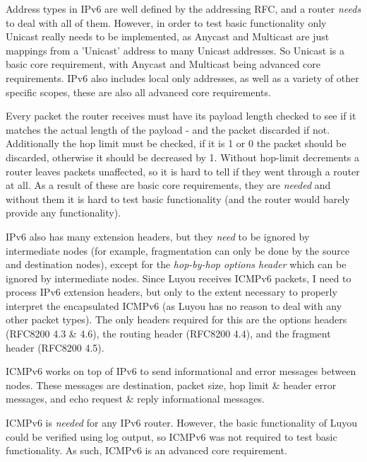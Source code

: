 \documentclass[12pt,a4paper,twoside,openany]{report}
\begin{document}
Address types in IPv6 are well defined by the addressing RFC\cite{ipv6_rfc_adr}, and a router \textit{needs} to deal with all of them.  However, in order to test basic functionality only Unicast really needs to be implemented, as Anycast and Multicast are just mappings from a 'Unicast' address to many Unicast addresses. So Unicast is a basic core requirement, with Anycast and Multicast being advanced core requirements. IPv6 also includes local only addresses, as well as a variety of other specific scopes, these are also all advanced core requirements.

\bigskip

Every packet the router receives must have its payload length checked to see if it matches the actual length of the payload - and the packet discarded if not.  Additionally the hop limit must be checked, if it is 1 or 0 the packet should be discarded, otherwise it should be decreased by 1.  Without hop-limit decrements a router leaves packets unaffected, so it is hard to tell if they went through a router at all. As a result of these are basic core requirements, they are \textit{needed} and without them it is hard to test basic functionality (and the router would barely provide any functionality). 

IPv6 also has many extension headers, but they \textit{need} to be ignored by intermediate nodes (for example, fragmentation can only be done by the source and destination nodes), except for the \textit{hop-by-hop options header} which can be ignored by intermediate nodes. Since Luyou receives ICMPv6 packets, I need to process IPv6 extension headers, but only to the extent necessary to properly interpret the encapsulated ICMPv6 (as Luyou has no reason to deal with any other packet types).  The only headers required for this are the options headers (RFC8200 4.3 \& 4.6\cite{ipv6_rfc}), the routing header (RFC8200 4.4\cite{ipv6_rfc}), and the fragment header (RFC8200 4.5\cite{ipv6_rfc}).

\bigskip

ICMPv6 works on top of IPv6 to send informational and error messages between nodes.  These messages are destination, packet size, hop limit \& header error messages, and echo request \& reply informational messages. 

ICMPv6 is \textit{needed} for any IPv6 router.  However, the basic functionality of Luyou could be verified using log output, so ICMPv6 was not required to test basic functionality. As such, ICMPv6 is an advanced core requirement.
\end{document}
